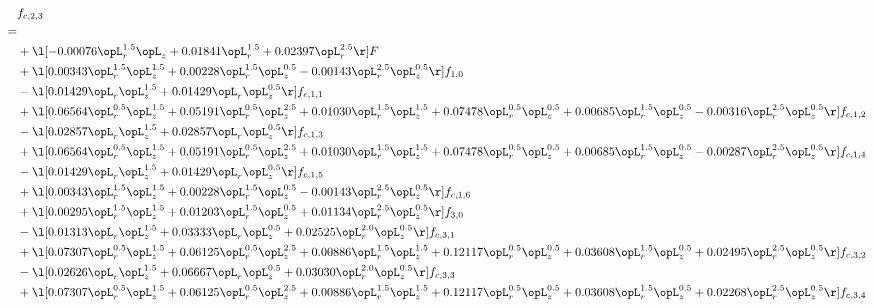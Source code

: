 \begin{alignat}{2} 
\label{eq:f_23_1} 
& f_{c,2,3} \nonumber \\ 
 = \\ 
& + \l[  -0.00076 \opL_r^{1.5} \opL_z +  0.01841 \opL_r^{1.5} +  0.02397 \opL_r^{2.5}  \r] F \nonumber \\ 
& + \l[  0.00343 \opL_r^{1.5} \opL_z^{1.5} +  0.00228 \opL_r^{1.5} \opL_z^{0.5}   -0.00143 \opL_r^{2.5} \opL_z^{0.5}  \r] f_{1,0} \nonumber \\ 
& - \l[  0.01429 \opL_r \opL_z^{1.5} +  0.01429 \opL_r \opL_z^{0.5}  \r] f_{c,1,1} \nonumber \\ 
& + \l[  0.06564 \opL_r^{0.5} \opL_z^{1.5} +  0.05191 \opL_r^{0.5} \opL_z^{2.5} +  0.01030 \opL_r^{1.5} \opL_z^{1.5} +  0.07478 \opL_r^{0.5} \opL_z^{0.5} +  0.00685 \opL_r^{1.5} \opL_z^{0.5}   -0.00316 \opL_r^{2.5} \opL_z^{0.5}  \r] f_{c,1,2} \nonumber \\ 
& - \l[  0.02857 \opL_r \opL_z^{1.5} +  0.02857 \opL_r \opL_z^{0.5}  \r] f_{c,1,3} \nonumber \\ 
& + \l[  0.06564 \opL_r^{0.5} \opL_z^{1.5} +  0.05191 \opL_r^{0.5} \opL_z^{2.5} +  0.01030 \opL_r^{1.5} \opL_z^{1.5} +  0.07478 \opL_r^{0.5} \opL_z^{0.5} +  0.00685 \opL_r^{1.5} \opL_z^{0.5}   -0.00287 \opL_r^{2.5} \opL_z^{0.5}  \r] f_{c,1,4} \nonumber \\ 
& - \l[  0.01429 \opL_r \opL_z^{1.5} +  0.01429 \opL_r \opL_z^{0.5}  \r] f_{c,1,5} \nonumber \\ 
& + \l[  0.00343 \opL_r^{1.5} \opL_z^{1.5} +  0.00228 \opL_r^{1.5} \opL_z^{0.5}   -0.00143 \opL_r^{2.5} \opL_z^{0.5}  \r] f_{c,1,6} \nonumber \\ 
& + \l[  0.00295 \opL_r^{1.5} \opL_z^{1.5} +  0.01203 \opL_r^{1.5} \opL_z^{0.5} +  0.01134 \opL_r^{2.5} \opL_z^{0.5}  \r] f_{3,0} \nonumber \\ 
& - \l[  0.01313 \opL_r \opL_z^{1.5} +  0.03333 \opL_r \opL_z^{0.5} +  0.02525 \opL_r^{2.0} \opL_z^{0.5}  \r] f_{c,3,1} \nonumber \\ 
& + \l[  0.07307 \opL_r^{0.5} \opL_z^{1.5} +  0.06125 \opL_r^{0.5} \opL_z^{2.5} +  0.00886 \opL_r^{1.5} \opL_z^{1.5} +  0.12117 \opL_r^{0.5} \opL_z^{0.5} +  0.03608 \opL_r^{1.5} \opL_z^{0.5} +  0.02495 \opL_r^{2.5} \opL_z^{0.5}  \r] f_{c,3,2} \nonumber \\ 
& - \l[  0.02626 \opL_r \opL_z^{1.5} +  0.06667 \opL_r \opL_z^{0.5} +  0.03030 \opL_r^{2.0} \opL_z^{0.5}  \r] f_{c,3,3} \nonumber \\ 
& + \l[  0.07307 \opL_r^{0.5} \opL_z^{1.5} +  0.06125 \opL_r^{0.5} \opL_z^{2.5} +  0.00886 \opL_r^{1.5} \opL_z^{1.5} +  0.12117 \opL_r^{0.5} \opL_z^{0.5} +  0.03608 \opL_r^{1.5} \opL_z^{0.5} +  0.02268 \opL_r^{2.5} \opL_z^{0.5}  \r] f_{c,3,4} \nonumber \\ 

\end{alignat}
